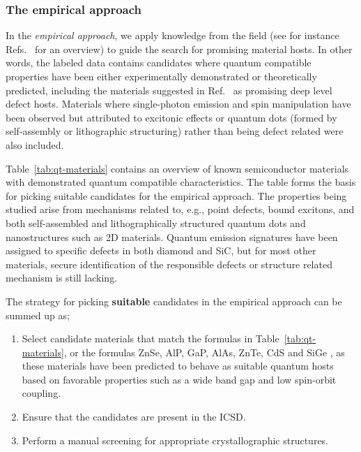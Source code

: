 \documentclass[superscriptaddress,
preprint,
 amsmath,amssymb,
 aps,
]{revtex4-2}
\newcommand{\mrk}[1]{\textcolor{red}{#1}}
\begin{document}
\subsubsection*{The empirical approach} 
In the \emph{empirical approach}, we apply knowledge from the field (see for instance  Refs.~\cite{Atatuere2018,Toth2019,Zhang2020,Son2020} for an overview) to guide the search for promising material hosts.  
In other words, the labeled data contains candidates where quantum compatible properties have been either experimentally demonstrated or theoretically predicted, including the materials suggested in Ref.~\cite{Weber2010} as promising deep level defect hosts. 
Materials where single-photon emission and spin manipulation have been observed but attributed to excitonic effects or quantum dots (formed by self-assembly or lithographic structuring) rather than being defect related were also included. 


Table~\ref{tab:qt-materials} contains an overview of known semiconductor materials with demonstrated quantum compatible characteristics. The table forms the basis for picking suitable candidates for the empirical approach. The properties being studied arise from mechanisms related to, e.g., point defects, bound excitons, and both self-assembled and lithographically structured quantum dots and nanostructures such as 2D materials. 
Quantum emission signatures have been assigned to specific defects in both diamond and SiC, but for most other materials, secure identification of the responsible defects or structure related mechanism is still lacking.  

The strategy for picking \textbf{suitable} candidates in the empirical approach can be summed up as;  
\begin{enumerate}
    \item Select candidate materials that match the formulas in  Table~\ref{tab:qt-materials}, or the formulas ZnSe, AlP, GaP, AlAs, ZnTe, CdS \cite{Weber2010} and SiGe \cite{Hardy2019}, as these materials have been predicted to behave as suitable quantum hosts based on favorable properties such as a wide band gap and low spin-orbit coupling.  
    \item Ensure that the candidates are present in the ICSD.  
    \item Perform a manual screening for appropriate crystallographic structures. 
\end{enumerate}
\end{document}
